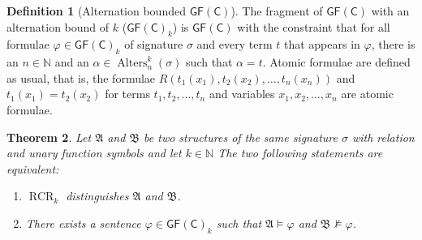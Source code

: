 \documentclass[a4paper,11pt,DIV=15]{scrartcl} %
\renewcommand{\phi}{\varphi}
\theoremstyle{plain}
\newtheorem{theorem}{Theorem}
\theoremstyle{definition}
\newtheorem{definition}[theorem]{Definition}
\newcommand{\GFC}{\mathsf{GF}(\mathsf{C})}
\newcommand{\RCR}{\operatorname{RCR}}
\begin{document}
\begin{definition}[Alternation bounded $\GFC$]
	The fragment of $\GFC$ with an alternation bound of $k$ ($\GFC_k$) is $\GFC$ with the constraint that for all formulae $\phi\in\GFC_k$ of signature $\sigma$ and every term $t$ that appears in $\phi$, there is an $n\in \mathbb{N}$ and an $\alpha\in \operatorname{Alters}_n^k(\sigma)$ such that $\alpha=t$.
	Atomic formulae are defined as usual, that is, the formulae $R(t_1(x_1),t_2(x_2),\dots,t_n(x_n))$ and $t_1(x_1)=t_2(x_2)$ for terms $t_1,t_2,\dots,t_n$ and variables $x_1,x_2,\dots,x_n$ are atomic formulae.
\end{definition}

\begin{theorem}
	Let $\mathfrak A$ and $\mathfrak B$ be two structures of the same signature $\sigma$ with relation and unary function symbols and let $k\in \mathbb{N}$
	The two following statements are equivalent:
	\begin{enumerate}
		\item $\RCR_k$ distinguishes $\mathfrak A$ and $\mathfrak B$.
		\item There exists a sentence $\phi\in\GFC_k$ such that $\mathfrak A\models \phi$ and $\mathfrak B\not\models \phi$.
	\end{enumerate}
\end{theorem}
\end{document}
